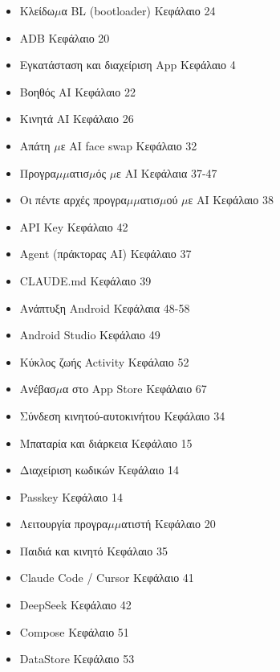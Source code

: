 


\begin{itemize}
  \item Κλείδω$\mu$α BL (bootloader) Κεφάλαιο 24
  \item ADB Κεφάλαιο 20
  \item Εγκατάσταση και διαχείριση App Κεφάλαιο 4
  \item Βοηθός AI Κεφάλαιο 22
  \item Κινητά AI Κεφάλαιο 26
  \item Απάτη $\mu$ε AI face swap Κεφάλαιο 32
  \item Προγρα$\mu$$\mu$ατισ$\mu$ός $\mu$ε AI Κεφάλαια 37-47
  \item Οι πέντε αρχές προγρα$\mu$$\mu$ατισ$\mu$ού $\mu$ε AI Κεφάλαιο 38
  \item API Key Κεφάλαιο 42
  \item Agent (πράκτορας AI) Κεφάλαιο 37
  \item CLAUDE.md Κεφάλαιο 39
  \item Ανάπτυξη Android Κεφάλαια 48-58
  \item Android Studio Κεφάλαιο 49
  \item Κύκλος ζωής Activity Κεφάλαιο 52
  \item Ανέβασ$\mu$α στο App Store Κεφάλαιο 67
\end{itemize}


\begin{itemize}
  \item Σύνδεση κινητού-αυτοκινήτου Κεφάλαιο 34
  \item Μπαταρία και διάρκεια Κεφάλαιο 15
  \item Διαχείριση κωδικών Κεφάλαιο 14
  \item Passkey Κεφάλαιο 14
  \item Λειτουργία προγρα$\mu$$\mu$ατιστή Κεφάλαιο 20
  \item Παιδιά και κινητό Κεφάλαιο 35
  \item Claude Code / Cursor Κεφάλαιο 41
  \item DeepSeek Κεφάλαιο 42
  \item Compose Κεφάλαιο 51
  \item DataStore Κεφάλαιο 53
\end{itemize}

